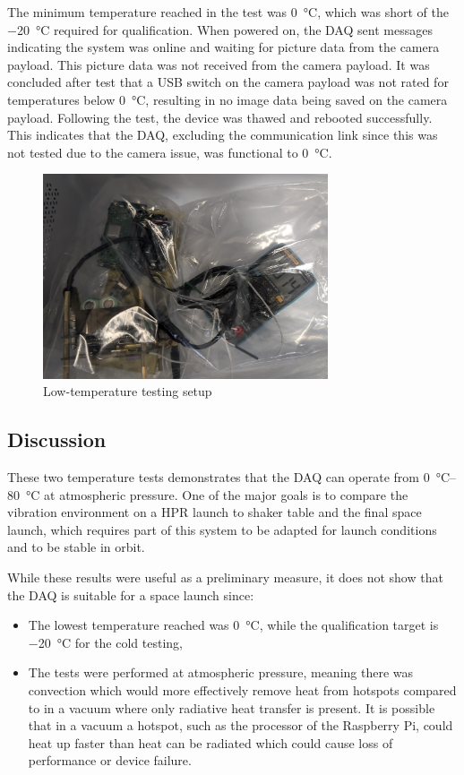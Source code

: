\documentclass{report}
\begin{document}
The minimum temperature reached in the test was \SI{0}{\degreeCelsius}, which was short of the \SI{-20}{\degreeCelsius} required for qualification. When powered on, the DAQ sent messages indicating the system was online and waiting for picture data from the camera payload. This picture data was not received from the camera payload. It was concluded after test that a USB switch on the camera payload was not rated for temperatures below \SI{0}{\degreeCelsius}, resulting in no image data being saved on the camera payload. Following the test, the device was thawed and rebooted successfully. This indicates that the DAQ, excluding the communication link since this was not tested due to the camera issue, was functional to \SI{0}{\degreeCelsius}.

\begin{figure}[H]
  \centering
  \includegraphics[width=0.75\textwidth]{images/fridge_test.jpg}
  \caption{Low-temperature testing setup}
  \label{fig:temperature-testing-fridge}
\end{figure}

\subsection{Discussion}

These two temperature tests demonstrates that the DAQ can operate from \SIrange{0}{80}{\degreeCelsius} at atmospheric pressure. One of the major goals is to compare the vibration environment on a HPR launch to shaker table and the final space launch, which requires part of this system to be adapted for launch conditions and to be stable in orbit.

While these results were useful as a preliminary measure, it does not show that the DAQ is suitable for a space launch since:
\begin{itemize}
  \item The lowest temperature reached was \SI{0}{\degreeCelsius}, while the qualification target is \SI{-20}{\degreeCelsius} for the cold testing,
  \item The tests were performed at atmospheric pressure, meaning there was convection which would more effectively remove heat from hotspots compared to in a vacuum where only radiative heat transfer is present. It is possible that in a vacuum a hotspot, such as the processor of the Raspberry Pi, could heat up faster than heat can be radiated which could cause loss of performance or device failure.
\end{itemize}
\end{document}
